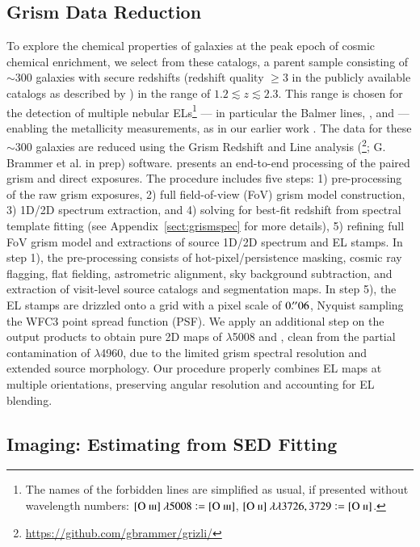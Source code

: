 \subsection{Grism Data Reduction}\label{subsect:grism_reduce}

To explore the chemical properties of galaxies at the peak epoch of cosmic chemical enrichment, we select from these
catalogs, a parent sample consisting of $\sim$300 galaxies with secure redshifts (\ie redshift quality $\geq$3 in 
the publicly available catalogs as described by \citet{2015ApJ...812..114T}) in the range of $1.2\lesssim 
z\lesssim2.3$.
This range is chosen for the detection of multiple nebular ELs\footnote{The names of the forbidden lines are
simplified as usual, if presented without wavelength numbers: $[\textrm{O}~\textsc{iii}]~\lambda5008\vcentcolon=[\textrm{O}~\textsc{iii}]$,
$[\textrm{O}~\textsc{ii}]~\lambda\lambda3726,3729\vcentcolon=[\textrm{O}~\textsc{ii}]$.} --- in particular the Balmer lines, \OIII, and \OII --- enabling the metallicity 
measurements, as in our earlier work \citep{2015AJ....149..107J,Wang:2016um}.
The \glass data for these $\sim$300 galaxies are reduced using the Grism Redshift and Line analysis
(\grzl\footnote{\url{https://github.com/gbrammer/grizli/}}; G. Brammer et al. in prep) software.
\grzl presents an end-to-end processing of the paired grism and direct exposures. The procedure includes five steps: 1)
pre-processing of the raw grism exposures, 2) full field-of-view (FoV) grism model construction, 3) 1D/2D spectrum extraction, and
4) solving for best-fit redshift from spectral template fitting (see Appendix~\ref{sect:grismspec} for more 
details), 5) refining full FoV grism model and extractions of source 1D/2D spectrum and EL stamps.
In step 1), the pre-processing consists of hot-pixel/persistence masking, cosmic ray flagging, flat fielding, astrometric
alignment, sky background subtraction, and extraction of visit-level source catalogs and segmentation maps.
In step 5), the EL stamps are drizzled onto a grid with a pixel scale of $0\mbox{$.\!^{\prime\prime}$}06$, Nyquist sampling the WFC3 point spread
function (PSF).
We apply an additional step on the \grzl output products to obtain pure 2D maps of \OIII$\lambda$5008 and \Hb, clean from the
partial contamination of \OIII$\lambda$4960, due to the limited grism spectral resolution and extended source morphology.
Our procedure properly combines EL maps at multiple orientations, preserving angular resolution and accounting for EL
blending.

\subsection{\hst Imaging: Estimating \Mstar from SED Fitting}\label{subsect:imaging_data}


